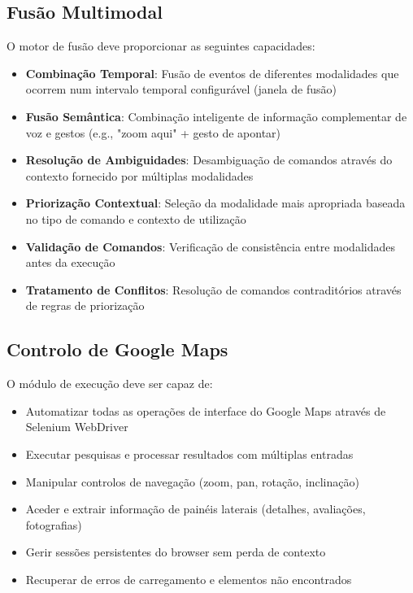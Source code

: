 \subsection{Fusão Multimodal}

O motor de fusão deve proporcionar as seguintes capacidades:

\begin{itemize}
    \item \textbf{Combinação Temporal}: Fusão de eventos de diferentes modalidades que ocorrem num intervalo temporal configurável (janela de fusão)
    \item \textbf{Fusão Semântica}: Combinação inteligente de informação complementar de voz e gestos (e.g., "zoom aqui" + gesto de apontar)
    \item \textbf{Resolução de Ambiguidades}: Desambiguação de comandos através do contexto fornecido por múltiplas modalidades
    \item \textbf{Priorização Contextual}: Seleção da modalidade mais apropriada baseada no tipo de comando e contexto de utilização
    \item \textbf{Validação de Comandos}: Verificação de consistência entre modalidades antes da execução
    \item \textbf{Tratamento de Conflitos}: Resolução de comandos contraditórios através de regras de priorização
\end{itemize}

\subsection{Controlo de Google Maps}

O módulo de execução deve ser capaz de:

\begin{itemize}
    \item Automatizar todas as operações de interface do Google Maps através de Selenium WebDriver
    \item Executar pesquisas e processar resultados com múltiplas entradas
    \item Manipular controlos de navegação (zoom, pan, rotação, inclinação)
    \item Aceder e extrair informação de painéis laterais (detalhes, avaliações, fotografias)
    \item Gerir sessões persistentes do browser sem perda de contexto
    \item Recuperar de erros de carregamento e elementos não encontrados
\end{itemize}

